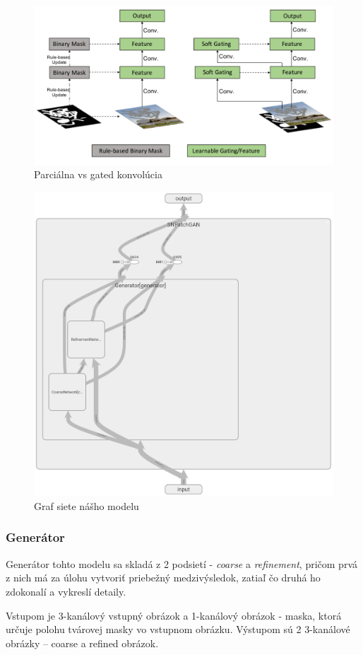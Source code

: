 \documentclass [11pt, a4paper]{article}
\begin{document}
				\begin{figure}[h]
					\centering
					\includegraphics[width=0.7\linewidth]{img/gated-conv}
					\caption{Parciálna vs gated konvolúcia}
					\label{fig:gated-conv}
				\end{figure}
				
			
			\begin{figure}[h]
				\centering
				\includegraphics[width=0.8\linewidth]{img/net-arch}
				\caption{Graf siete nášho modelu}
				\label{fig:net-arch}
			\end{figure}
		
			\subsubsection{Generátor}
				Generátor tohto modelu sa skladá z 2 podsietí - \textit{coarse} a \textit{refinement}, pričom prvá z nich má za úlohu vytvoriť priebežný medzivýsledok, zatiaľ čo druhá ho zdokonalí a vykreslí detaily.
				
				Vstupom je 3-kanálový vstupný obrázok a 1-kanálový obrázok - maska, ktorá určuje polohu tvárovej masky vo vstupnom obrázku. Výstupom sú 2 3-kanálové obrázky -- coarse a refined obrázok.
				
\end{document}
